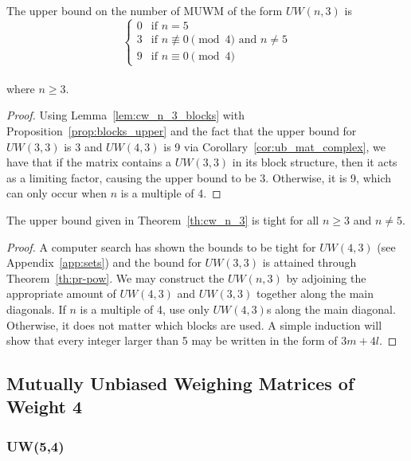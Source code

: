 \begin{theorem} \label{th:cw_n_3}
 The upper bound on the number of MUWM of the form $UW(n,3)$ is
  $$\begin{cases}
   0 & \text{if } n = 5 \\
   3 & \text{if } n \not\equiv 0 \pmod 4 \text{ and } n \neq 5 \\
   9 & \text{if } n \equiv 0 \pmod 4
  \end{cases}$$
\\ where $n \geq 3$.
\begin{proof}

Using Lemma~\ref{lem:cw_n_3_blocks} with Proposition~\ref{prop:blocks_upper} and the fact that the upper bound for $UW(3,3)$ is 3 and $UW(4,3)$ is 9 via Corollary~\ref{cor:ub_mat_complex}, we have that if the matrix contains a $UW(3,3)$ in its block structure, then it acts as a limiting factor, causing the upper bound to be 3. Otherwise, it is 9, which can only occur when $n$ is a multiple of 4.
\end{proof}
\end{theorem}

\begin{corollary} \label{cor:cw_n_3}
 The upper bound given in Theorem~\ref{th:cw_n_3} is tight for all $n \geq 3$ and $n \neq 5$.
\begin{proof}
 A computer search has shown the bounds to be tight for $UW(4,3)$ (see Appendix~\ref{app:sets}) and the bound for $UW(3,3)$ is attained through Theorem~\ref{th:pr-pow}. We may construct the $UW(n,3)$ by adjoining the appropriate amount of $UW(4,3)$ and $UW(3,3)$ together along the main diagonals. If $n$ is a multiple of 4, use only $UW(4,3)$s along the main diagonal. Otherwise, it does not matter which blocks are used. A simple induction will show that every integer larger than 5 may be written in the form of $3m+4l$.
\end{proof}
\end{corollary}

\subsection[Weight 4]{Mutually Unbiased Weighing Matrices of Weight 4}
\label{sec:muwm-w4}

\subsubsection{UW(5,4)}

